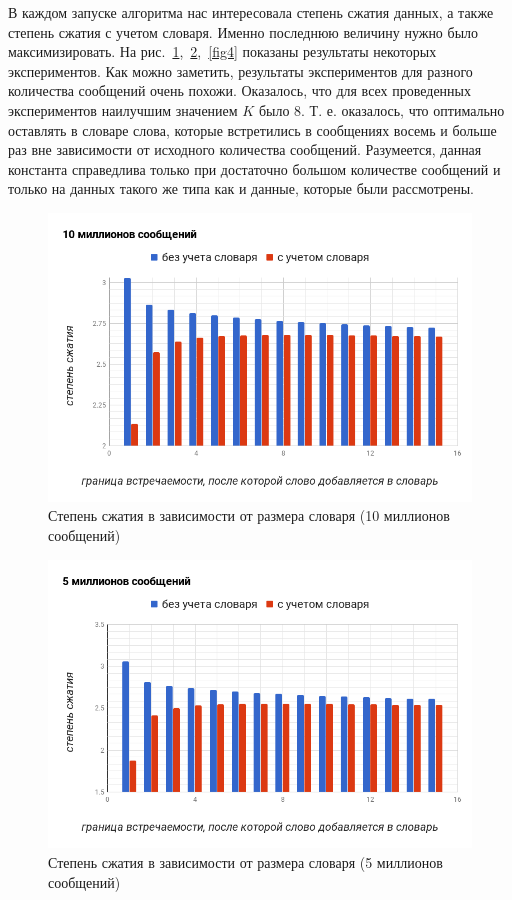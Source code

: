 В каждом запуске алгоритма нас интересовала степень сжатия данных, а также степень сжатия с учетом словаря. Именно последнюю величину нужно было максимизировать.
На рис.~\ref{fig2},~\ref{fig3},~\ref{fig4} показаны результаты некоторых экспериментов. Как можно заметить, результаты экспериментов для разного количества сообщений очень похожи.
Оказалось, что для всех проведенных экспериментов наилучшим значением $K$ было 8. Т. е. оказалось, что оптимально оставлять в словаре слова, которые встретились в сообщениях
восемь и больше раз вне зависимости от исходного количества сообщений. Разумеется, данная константа справедлива только при достаточно большом количестве сообщений и
только на данных такого же типа как и данные, которые были рассмотрены.

\begin{figure}[h!]
  \includegraphics[width=5in]{pics/compress10m.png}
  \caption{Степень сжатия в зависимости от размера словаря (10 миллионов сообщений)}
  \label{fig2}
\end{figure}

\begin{figure}[h!]
  \includegraphics[width=5in]{pics/compress5m.png}
  \caption{Степень сжатия в зависимости от размера словаря (5 миллионов сообщений)}
  \label{fig3}
\end{figure}

